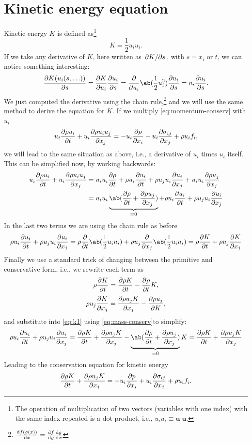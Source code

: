 \documentclass[justified, nobib,a4paper]{tufte-handout}
\begin{document}
\section{Kinetic energy equation}
Kinetic energy \(K\) is defined as\footnote{%
  The operation of multiplication of two vectors (variables with one index)
  with the same index repeated is a dot product, i.e., \(u_i u_i \equiv \bm{u}\bm{\cdot}\bm{u}\).
}
\[
  K = \frac{1}{2}u_i u_i.
\]
If we take any derivative of \(K\), here written as \(\pdv{K}/{s}\), with \(s = x_i\) or \(t\), 
we can notice something interesting:
\[
  \pdv{K(u_i(s, \ldots))}{s} = \pdv{K}{u_i}\pdv{u_i}{s} = \pdv{}{u_i}\ab(\frac{1}{2}u_i^2)\pdv{u_i}{s} = u_i \pdv{u_i}{s}.
\]
We just computed the derivative using the chain rule,\footnote{
  \(\odv{f(g(x))}{x} = \odv{f}{g}\odv{g}{x}\)
}
and we will use the same method to derive the equation for \(K\). If we
multiply \cref{eq:momentum-conserv} with \(u_i\) 
\[
  u_i\pdv{\rho u_i}{t} + u_i\pdv{\rho u_i u_j}{x_j} = -u_i\pdv{p}{x_i} + u_i\pdv{\sigma_{ij}}{x_j} + \rho u_i f_i,
\]
we will lead to the same situation as above, i.e., a derivative of \(u_i\)
times \(u_i\) itself. This can be simplified now, by working backwards:
\begin{equation}
  \begin{split}
    u_i\pdv{\rho u_i}{t} + u_i\pdv{\rho u_i u_j}{x_j} &= 
    u_i u_i\pdv{\rho}{t} + \rho u_i \pdv{u_i}{t} 
    + \rho u_j u_i \pdv{u_i}{x_j} + u_i u_i \pdv{\rho u_j}{x_j} \\
    &= u_i u_i \underbrace{\ab( \pdv{\rho}{t} + \pdv{\rho u_j}{x_j})}_{=0} + 
    \rho u_i \pdv{u_i}{t} + \rho u_j u_i \pdv{u_i}{x_j}
  \end{split}
  \label{eq:k1}
\end{equation}
In the last two terms we are using the chain rule as before
\[
  \rho u_i \pdv{u_i}{t} + \rho u_j u_i \pdv{u_i}{x_j} 
  = \rho \pdv{}{t}\ab(\frac{1}{2}u_i u_i) 
  + \rho u_j \pdv{}{x_j}\ab(\frac{1}{2}u_i u_i)
  = \rho \pdv{K}{t} + \rho u_j \pdv{K}{x_j}
\]
Finally we use a standard trick of changing between the primitive and conservative 
form, i.e., we rewrite each term as
\[
  \rho \pdv{K}{t} = \pdv{\rho K}{t} - \pdv{\rho}{t} K,
\]
\[
  \rho u_j \pdv{K}{x_j} = \pdv{\rho u_j K}{x_j} - \pdv{\rho u_j} K,
\]
and substitute into \cref{eq:k1} using \cref{eq:mass-conserv}to simplify:
\[
 \rho u_i \pdv{u_i}{t} + \rho u_j u_i \pdv{u_i}{x_j} = 
  \pdv{\rho K}{t} + \pdv{\rho u_j K}{x_j} - \underbrace{\ab(\pdv{\rho}{t} + \pdv{\rho u_j}{x_j})}_{=0} K
  = \pdv{\rho K}{t} + \pdv{\rho u_j K}{x_j}
\]
Leading to the conservation equation for kinetic energy
\[
  \pdv{\rho K}{t} + \pdv{\rho u_j K}{x_j} 
  = -u_i\pdv{p}{x_i} + u_i\pdv{\sigma_{ij}}{x_j} + \rho u_i f_i.
\]
\end{document}
